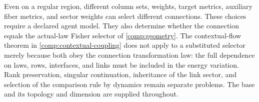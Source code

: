 Even on a regular region, different column sets, weights, target metrics, auxiliary fiber metrics, and sector weights can select different connections. These choices require a declared agent model. They also determine whether the connection equals the actual-law Fisher selector of \cref{comp:geometry}. The contextual-flow theorem in \cref{comp:contextual-coupling} does not apply to a substituted selector merely because both obey the connection transformation law: the full dependence on laws, rows, interfaces, and links must be included in the energy variation. Rank preservation, singular continuation, inheritance of the link sector, and selection of the comparison rule by dynamics remain separate problems. The base and its topology and dimension are supplied throughout.
